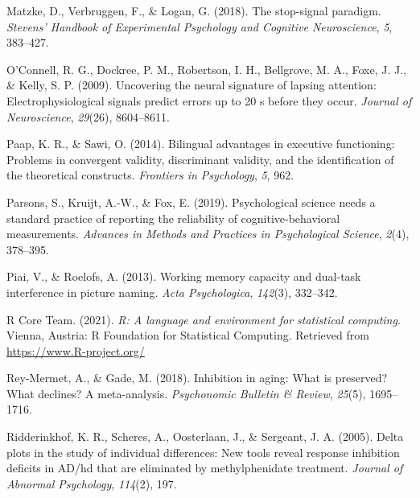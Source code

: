\documentclass[
  man,floatsintext]{apa6}
\newlength{\cslhangindent}
\newlength{\cslentryspacingunit} %
\newenvironment{CSLReferences}[2] %
 {%
  \setlength{\parindent}{0pt}
  \ifodd #1
  \let\oldpar\par
  \def\par{\hangindent=\cslhangindent\oldpar}
  \fi
  \setlength{\parskip}{#2\cslentryspacingunit}
 }%
 {}
\begin{document}
\begin{CSLReferences}{1}{0}
\leavevmode{}%
Matzke, D., Verbruggen, F., \& Logan, G. (2018). The stop-signal paradigm. \emph{Stevens' Handbook of Experimental Psychology and Cognitive Neuroscience}, \emph{5}, 383--427.

\leavevmode{}%
O'Connell, R. G., Dockree, P. M., Robertson, I. H., Bellgrove, M. A., Foxe, J. J., \& Kelly, S. P. (2009). Uncovering the neural signature of lapsing attention: Electrophysiological signals predict errors up to 20 s before they occur. \emph{Journal of Neuroscience}, \emph{29}(26), 8604--8611.

\leavevmode{}%
Paap, K. R., \& Sawi, O. (2014). Bilingual advantages in executive functioning: Problems in convergent validity, discriminant validity, and the identification of the theoretical constructs. \emph{Frontiers in Psychology}, \emph{5}, 962.

\leavevmode{}%
Parsons, S., Kruijt, A.-W., \& Fox, E. (2019). Psychological science needs a standard practice of reporting the reliability of cognitive-behavioral measurements. \emph{Advances in Methods and Practices in Psychological Science}, \emph{2}(4), 378--395.

\leavevmode{}%
Piai, V., \& Roelofs, A. (2013). Working memory capacity and dual-task interference in picture naming. \emph{Acta Psychologica}, \emph{142}(3), 332--342.

\leavevmode{}%
R Core Team. (2021). \emph{R: A language and environment for statistical computing}. Vienna, Austria: R Foundation for Statistical Computing. Retrieved from \url{https://www.R-project.org/}

\leavevmode{}%
Rey-Mermet, A., \& Gade, M. (2018). Inhibition in aging: What is preserved? What declines? A meta-analysis. \emph{Psychonomic Bulletin \& Review}, \emph{25}(5), 1695--1716.

\leavevmode{}%
Ridderinkhof, K. R., Scheres, A., Oosterlaan, J., \& Sergeant, J. A. (2005). Delta plots in the study of individual differences: New tools reveal response inhibition deficits in AD/hd that are eliminated by methylphenidate treatment. \emph{Journal of Abnormal Psychology}, \emph{114}(2), 197.


\end{CSLReferences}
\end{document}

